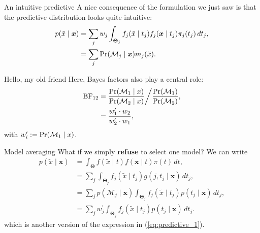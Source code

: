 \begin{frame}{An intuitive predictive}
A nice consequence of the formulation we just saw is that the predictive distribution looks quite intuitive:
\begin{align}
\nonumber
 p(\tilde{x} \mid \boldsymbol{x}) &= \sum_{j} w_j \int_{\boldsymbol{\Theta}_j} f_j(\tilde{x} \mid t_j) f_j(\boldsymbol{x}\mid t_j)\pi_j(t_j)\,dt_j,\\
 \label{eq:predictive_1}
 &= \sum_{j} \operatorname{Pr}(\mathcal{M}_j \mid \boldsymbol{x}) m_j(\tilde{x}).
\end{align}
\end{frame}
\begin{frame}{Hello, my old friend}
Here, Bayes factors also play a central role:
\begin{align*}
 \operatorname{BF}_{12} &= \frac{\operatorname{Pr}(\mathcal{M}_1 \mid x)}{\operatorname{Pr}(\mathcal{M}_2 \mid x)}\bigg/\frac{\operatorname{Pr}(\mathcal{M}_1)}{\operatorname{Pr}(\mathcal{M}_2)},\\
  &= \frac{w_1^\prime \cdot w_2}{w_2^\prime \cdot w_1},
\end{align*}
with $w_i^\prime := \operatorname{Pr}(\mathcal{M}_1 \mid x)$.
\end{frame}
\begin{frame}{Model averaging}
What if we simply \textbf{refuse} to select one model?
We can write
\begin{align}
 \nonumber
 p(\tilde{x} \mid \boldsymbol{x})  &= \int_{\boldsymbol{\Theta}} f(\tilde{x} \mid t) f(\boldsymbol{x}\mid t)\pi(t)\,dt,\\
 \nonumber
 &= \sum_{j} \int_{\boldsymbol{\Theta}_j} f_j(\tilde{x} \mid t_j) g(j, t_j \mid \boldsymbol{x})\,dt_j,\\
 \nonumber
 &= \sum_j p (\mathcal{M}_j \mid \boldsymbol{x}) \int_{\boldsymbol{\Theta}_j} f_j(\tilde{x} \mid t_j) p(t_j \mid \boldsymbol{x})\,dt_j,\\
 \label{eq:predictive_2}
  &= \sum_j w_j^\prime \int_{\boldsymbol{\Theta}_j} f_j(\tilde{x} \mid t_j) p(t_j \mid \boldsymbol{x})\,dt_j.
\end{align}
which is another version of the expression in (\ref{eq:predictive_1}).
\end{frame}
